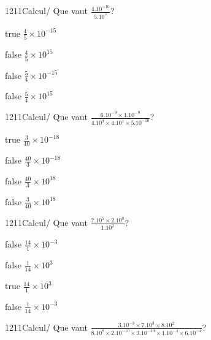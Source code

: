 \documentclass[11pt]{article}
\begin{document}
            \begin{question}{1211}{Calcul}{}{/}
                Que vaut $\frac{4.10^{-10}}{5.10^{5}}$?
            \end{question}
            
            \begin{reponses}
                \item[true] $\frac{4}{5}\times 10^{-15}$
                \item[false] $\frac{4}{5}\times 10^{15}$
                \item[false] $\frac{5}{4}\times 10^{-15}$
                \item[false] $\frac{5}{4}\times 10^{15}$
            \end{reponses}
            
            \begin{question}{1211}{Calcul}{}{/}
                Que vaut $\frac{6.10^{-9}\times 1.10^{-9}}{4.10^{9}\times 4.10^{1}\times 5.10^{-10}}$?
            \end{question}
            
            \begin{reponses}
                \item[true] $\frac{3}{40}\times 10^{-18}$
                \item[false] $\frac{40}{3}\times 10^{-18}$
                \item[false] $\frac{40}{3}\times 10^{18}$
                \item[false] $\frac{3}{40}\times 10^{18}$
            \end{reponses}
            
            \begin{question}{1211}{Calcul}{}{/}
                Que vaut $\frac{7.10^{5}\times 2.10^{0}}{1.10^{2}}$?
            \end{question}
            
            \begin{reponses}
                \item[false] $\frac{14}{1}\times 10^{-3}$
                \item[false] $\frac{1}{14}\times 10^{3}$
                \item[true] $\frac{14}{1}\times 10^{3}$
                \item[false] $\frac{1}{14}\times 10^{-3}$
            \end{reponses}
            
            \begin{question}{1211}{Calcul}{}{/}
                Que vaut $\frac{3.10^{-3}\times 7.10^{3}\times 8.10^{2}}{8.10^{8}\times 2.10^{-10}\times 3.10^{-10}\times 1.10^{-4}\times 6.10^{-4}}$?
            \end{question}
            
\end{document}
